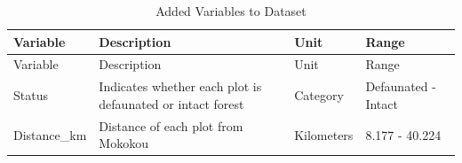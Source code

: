 \documentclass[
  12pt,
]{article}
\begin{document}
\begin{longtable}[]{@{}llll@{}}
\caption{Added Variables to Dataset}\tabularnewline
\toprule
\begin{minipage}[b]{0.10\columnwidth}\raggedright
Variable\strut
\end{minipage} & \begin{minipage}[b]{0.51\columnwidth}\raggedright
Description\strut
\end{minipage} & \begin{minipage}[b]{0.10\columnwidth}\raggedright
Unit\strut
\end{minipage} & \begin{minipage}[b]{0.17\columnwidth}\raggedright
Range\strut
\end{minipage}\tabularnewline
\midrule
\endfirsthead
\toprule
\begin{minipage}[b]{0.10\columnwidth}\raggedright
Variable\strut
\end{minipage} & \begin{minipage}[b]{0.51\columnwidth}\raggedright
Description\strut
\end{minipage} & \begin{minipage}[b]{0.10\columnwidth}\raggedright
Unit\strut
\end{minipage} & \begin{minipage}[b]{0.17\columnwidth}\raggedright
Range\strut
\end{minipage}\tabularnewline
\midrule
\endhead
\begin{minipage}[t]{0.10\columnwidth}\raggedright
Status\strut
\end{minipage} & \begin{minipage}[t]{0.51\columnwidth}\raggedright
Indicates whether each plot is defaunated or intact forest\strut
\end{minipage} & \begin{minipage}[t]{0.10\columnwidth}\raggedright
Category\strut
\end{minipage} & \begin{minipage}[t]{0.17\columnwidth}\raggedright
Defaunated - Intact\strut
\end{minipage}\tabularnewline
\begin{minipage}[t]{0.10\columnwidth}\raggedright
Distance\_km\strut
\end{minipage} & \begin{minipage}[t]{0.51\columnwidth}\raggedright
Distance of each plot from Mokokou\strut
\end{minipage} & \begin{minipage}[t]{0.10\columnwidth}\raggedright
Kilometers\strut
\end{minipage} & \begin{minipage}[t]{0.17\columnwidth}\raggedright
8.177 - 40.224\strut
\end{minipage}\tabularnewline
\bottomrule
\end{longtable}
\end{document}
